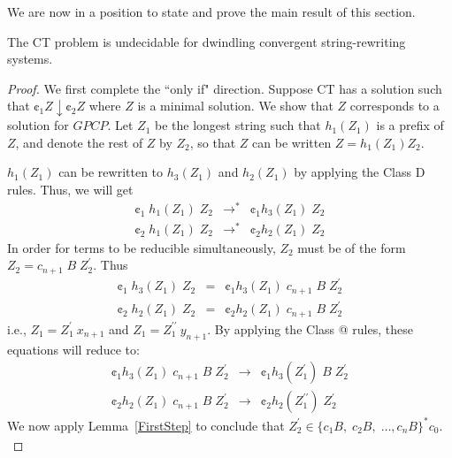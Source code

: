 \documentclass{lmcs} %
\makeatletter
\theoremstyle{plain}\newtheorem{satz}[thm]{Satz} %
\newcommand*{\rom}[1]{\expandafter\@slowromancap\romannumeral #1@}
\makeatother
\begin{document}
    We are now in a position to state and prove the main result of
this section.

  \begin{thm} The CT problem is undecidable for dwindling convergent
string-rewriting systems.
  \end{thm}

  \begin{proof} We first complete the ``only if" direction. Suppose CT
has a solution such that $\cent_1 Z \downarrow \cent_2 Z$ where $Z$ is
a minimal solution. We show that $Z$ corresponds to a solution for
$GPCP$. Let $Z_1$ be the longest string such that $h_1(Z_1)$ is a prefix
of $Z$, and denote the rest of $Z$ by $Z_2$, so that $Z$ can be written $Z = h_1(Z_1)Z_2$.
 

    $h_1(Z_1)$ can be rewritten to $h_3(Z_1)$ and $h_2(Z_1)$ by
applying the Class D rules. Thus, we will get
\begin{eqnarray*} \cent_1 \;h_1(Z_1)\; Z_2 & \rightarrow^{*} & \cent_1
h_3(Z_1)\; Z_2 \\ \cent_2 \;h_1(Z_1)\; Z_2 & \rightarrow^{*} & \cent_2
h_2(Z_1)\; Z_2
\end{eqnarray*} In order for terms to be reducible simultaneously,
$Z_2$ must be of the form $Z_2 = c_{n+1}\;B\;Z_2^{\prime}$. Thus
\begin{eqnarray*} \cent_1 \;h_3(Z_1)\; Z_2 & = & \cent_1 h_3(Z_1)\;
c_{n+1}\;B\;Z_2^{\prime} \\ \cent_2 \;h_2(Z_1)\; Z_2 & = & \cent_2
h_2(Z_1)\; c_{n+1}\;B\;Z_2^{\prime}
\end{eqnarray*} i.e., $Z_1 = Z_1^\prime \: x_{n+1}$ and $Z_1 =
Z_1^{\prime\prime} \: y_{n+1}$.  By applying the Class \rom{3} rules,
these equations will reduce to:
\begin{eqnarray*} \cent_1 h_3(Z_1)\; c_{n+1}\;B\;Z_2^{\prime} &
\rightarrow & \cent_1 h_3(Z_1^\prime) \; B\;Z_2^{\prime}\\ \cent_2
h_2(Z_1)\; c_{n+1}\;B\;Z_2^{\prime} & \rightarrow & \cent_2
h_2(Z_1^{\prime\prime}) \; Z_2^{\prime}
\end{eqnarray*} We now apply Lemma~\ref{FirstStep} to conclude that
$Z_2^{\prime} \in \{c_1B,\;c_2B,\; \ldots,c_nB\}_{}^{*}c_0$.\\[-5pt]


\end{proof}
\end{document}
